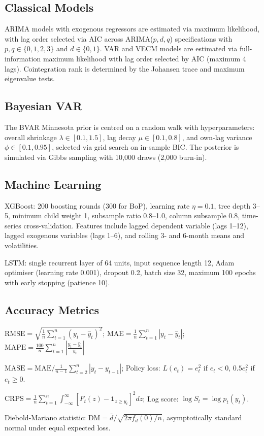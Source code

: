 \documentclass[12pt,a4paper]{article}
\begin{document}
\subsection{Classical Models}

ARIMA models with exogenous regressors are estimated via maximum likelihood, with lag order selected via AIC across ARIMA($p,d,q$) specifications with $p, q \in \{0,1,2,3\}$ and $d \in \{0,1\}$. VAR and VECM models are estimated via full-information maximum likelihood with lag order selected by AIC (maximum 4 lags). Cointegration rank is determined by the Johansen trace and maximum eigenvalue tests.

\subsection{Bayesian VAR}

The BVAR Minnesota prior is centred on a random walk with hyperparameters: overall shrinkage $\lambda \in [0.1, 1.5]$, lag decay $\mu \in [0.1, 0.8]$, and own-lag variance $\phi \in [0.1, 0.95]$, selected via grid search on in-sample BIC. The posterior is simulated via Gibbs sampling with 10,000 draws (2,000 burn-in).

\subsection{Machine Learning}

XGBoost: 200 boosting rounds (300 for BoP), learning rate $\eta = 0.1$, tree depth 3--5, minimum child weight 1, subsample ratio 0.8--1.0, column subsample 0.8, time-series cross-validation. Features include lagged dependent variable (lags 1--12), lagged exogenous variables (lags 1--6), and rolling 3- and 6-month means and volatilities.

LSTM: single recurrent layer of 64 units, input sequence length 12, Adam optimiser (learning rate 0.001), dropout 0.2, batch size 32, maximum 100 epochs with early stopping (patience 10).

\subsection{Accuracy Metrics}

$\text{RMSE} = \sqrt{\frac{1}{n} \sum_{t=1}^{n} (y_t - \hat{y}_t)^2}$; \quad $\text{MAE} = \frac{1}{n} \sum_{t=1}^{n} |y_t - \hat{y}_t|$; \quad $\text{MAPE} = \frac{100}{n} \sum_{t=1}^{n} \left| \frac{y_t - \hat{y}_t}{y_t} \right|$

$\text{MASE} = \text{MAE} \big/ \frac{1}{n-1} \sum_{t=2}^{n} |y_t - y_{t-1}|$; \quad Policy loss: $L(e_t) = e_t^2$ if $e_t < 0$, $0.5 e_t^2$ if $e_t \geq 0$.

$\text{CRPS} = \frac{1}{n} \sum_{t=1}^{n} \int_{-\infty}^{\infty} [F_t(z) - \mathbf{1}_{z \geq y_t}]^2 dz$; \quad Log score: $\log S_t = \log p_t(y_t)$.

Diebold-Mariano statistic: $\text{DM} = \bar{d} / \sqrt{2\pi f_d(0) / n}$, asymptotically standard normal under equal expected loss.
\end{document}
